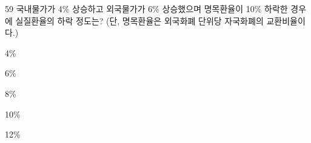 \begin{question}{59}
국내물가가 4\% 상승하고 외국물가가 6\% 상승했으며 명목환율이 10\% 하락한 경우에 실질환율의 하락 정도는? (단, 명목환율은 외국화폐 단위당 자국화폐의 교환비율이다.)
\begin{choices}
  \item 4\%
  \item 6\%
  \item 8\%
  \item 10\%
  \item 12\%
\end{choices}
\end{question}
